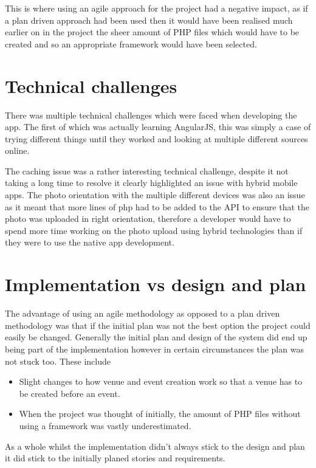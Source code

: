 This is where using an agile approach for the project had a negative impact, as if a plan driven approach had been used then it would have been realised much earlier on in the project the sheer amount of PHP files which would have to be created and so an appropriate framework would have been selected.

\section{Technical challenges}
There was multiple technical challenges which were faced when developing the app. The first of which was actually learning AngularJS, this was simply a case of trying different things until they worked and looking at multiple different sources online.

The caching issue was a rather interesting technical challenge, despite it not taking a long time to resolve it clearly highlighted an issue with hybrid mobile apps. The photo orientation with the multiple different devices was also an issue as it meant that more lines of php had to be added to the API to ensure that the photo was uploaded in right orientation, therefore a developer would have to spend more time working on the photo upload using hybrid technologies than if they were to use the native app development.

\section{Implementation vs design and plan}
The advantage of using an agile methodology as opposed to a plan driven methodology was that if the initial plan was not the best option the project could easily be changed. Generally the initial plan and design of the system did end up being part of the implementation however in certain circumstances the plan was not stuck too. These include 
\begin{itemize}
  \item Slight changes to how venue and event creation work so that a venue has to be created before an event.
  \item When the project was thought of initially, the amount of PHP files without using a framework was vastly underestimated.
\end{itemize}
As a whole whilst the implementation didn't always stick to the design and plan it did stick to the initially planed stories and requirements.
